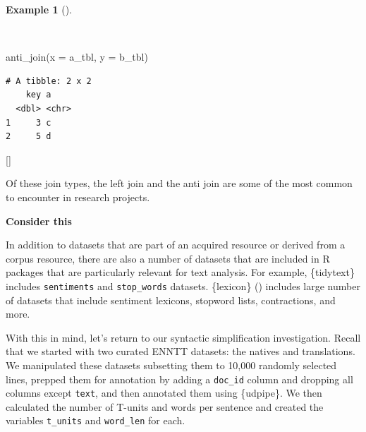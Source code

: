 \documentclass[
  letterpaper,
  krantz1]{latex/krantz-mod}
\newenvironment{Shaded}{\begin{snugshade}}{\end{snugshade}}
\newcommand{\AttributeTok}[1]{\textcolor[rgb]{0.00,0.00,0.00}{#1}}
\newcommand{\FunctionTok}[1]{\textcolor[rgb]{0.00,0.00,0.00}{#1}}
\newcommand{\NormalTok}[1]{\textcolor[rgb]{0.00,0.00,0.00}{#1}}
\newcommand{\cindex}[1]{%
  \StrSubstitute{#1}{_}{\_}[\temp]%
  \index{\temp}%
}
\theoremstyle{definition}
\theoremstyle{definition}
\newtheorem{example}{Example}[chapter]
\theoremstyle{remark}
\begin{document}
\begin{example}[]\protect\hypertarget{exm-transform-merging-join-anti}{}\label{exm-transform-merging-join-anti}

~

\begin{Shaded}
\begin{Highlighting}[numbers=left,,]
\FunctionTok{anti\_join}\NormalTok{(}\AttributeTok{x =}\NormalTok{ a\_tbl, }\AttributeTok{y =}\NormalTok{ b\_tbl)}
\end{Highlighting}
\end{Shaded}

\begin{verbatim}
# A tibble: 2 x 2
    key a    
  <dbl> <chr>
1     3 c    
2     5 d    
\end{verbatim}

\cindex{anti_join()}

\end{example}

Of these join types, the left join and the anti join are some of the
most common to encounter in research projects.

\begin{tcolorbox}[enhanced jigsaw, toprule=.15mm, breakable, colback=white, arc=.35mm, left=2mm, colframe=quarto-callout-color-frame, opacityback=0, bottomrule=.15mm, rightrule=.15mm, leftrule=.75mm]

\textbf{ Consider this}

In addition to datasets that are part of an acquired resource or derived
from a corpus resource, there are also a number of datasets that are
included in R packages that are particularly relevant for text analysis.
For example, \{tidytext\} includes \texttt{sentiments} and
\texttt{stop\_words} datasets. \{lexicon\}
() includes large number of
datasets that include sentiment lexicons, stopword lists, contractions,
and more.

\end{tcolorbox}

With this in mind, let's return to our syntactic simplification
investigation. Recall that we started with two curated ENNTT datasets:
the natives and
translations.
We manipulated these datasets subsetting them to 10,000 randomly
selected lines, prepped them for annotation by adding a \texttt{doc\_id}
column and dropping all columns except \texttt{text}, and then annotated
them using \{udpipe\}. We then calculated the number of T-units and
words per sentence and created the variables \texttt{t\_units} and
\texttt{word\_len} for each.
\end{document}
